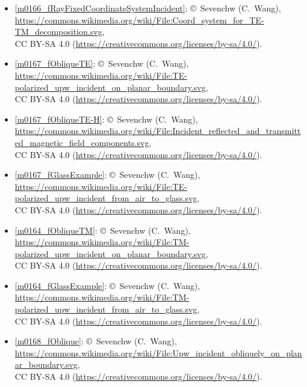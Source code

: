 \begin{itemize}
\item[Fig.] \label{m0166_fRayFixedCoordinateSystemIncident_Credit}
  \ref{m0166_fRayFixedCoordinateSystemIncident}:
  \copyright~Sevenchw (C.\ Wang), 
  \url{https://commons.wikimedia.org/wiki/File:Coord_system_for_TE-TM_decomposition.svg},\\ 
  CC BY-SA 4.0 (\url{https://creativecommons.org/licenses/by-sa/4.0/}).

\item[Fig.] \label{m0167_fObliqueTE_Credit}
  \ref{m0167_fObliqueTE}:
  \copyright~Sevenchw (C.\ Wang), 
  \url{https://commons.wikimedia.org/wiki/File:TE-polarized_upw_incident_on_planar_boundary.svg},\\ 
  CC BY-SA 4.0 (\url{https://creativecommons.org/licenses/by-sa/4.0/}).

\item[Fig.] \label{m0167_fObliqueTE-H_Credit}
  \ref{m0167_fObliqueTE-H}:
  \copyright~Sevenchw (C.\ Wang), 
  \url{https://commons.wikimedia.org/wiki/File:Incident_reflected_and_transmitted_magnetic_field_components.svg},\\ 
  CC BY-SA 4.0 (\url{https://creativecommons.org/licenses/by-sa/4.0/}).

\item[Fig.] \label{m0167_fGlassExample_Credit}
  \ref{m0167_fGlassExample}:
  \copyright~Sevenchw (C.\ Wang), 
  \url{https://commons.wikimedia.org/wiki/File:TE-polarized_upw_incident_from_air_to_glass.svg},\\ 
  CC BY-SA 4.0 (\url{https://creativecommons.org/licenses/by-sa/4.0/}).

\item[Fig.] \label{m0164_fObliqueTM_Credit}
  \ref{m0164_fObliqueTM}:
  \copyright~Sevenchw (C.\ Wang), 
  \url{https://commons.wikimedia.org/wiki/File:TM-polarized_upw_incident_on_planar_boundary.svg},\\ 
  CC BY-SA 4.0 (\url{https://creativecommons.org/licenses/by-sa/4.0/}).

\item[Fig.] \label{m0164_fGlassExample_Credit}
  \ref{m0164_fGlassExample}:
  \copyright~Sevenchw (C.\ Wang), 
  \url{https://commons.wikimedia.org/wiki/File:TM-polarized_upw_incident_from_air_to_glass.svg},\\ 
  CC BY-SA 4.0 (\url{https://creativecommons.org/licenses/by-sa/4.0/}).

\item[Fig.] \label{m0168_fOblique_Credit}
  \ref{m0168_fOblique}:
  \copyright~Sevenchw (C.\ Wang), 
  \url{https://commons.wikimedia.org/wiki/File:Upw_incident_obliquely_on_planar_boundary.svg},\\ 
  CC BY-SA 4.0 (\url{https://creativecommons.org/licenses/by-sa/4.0/}).


\end{itemize}
